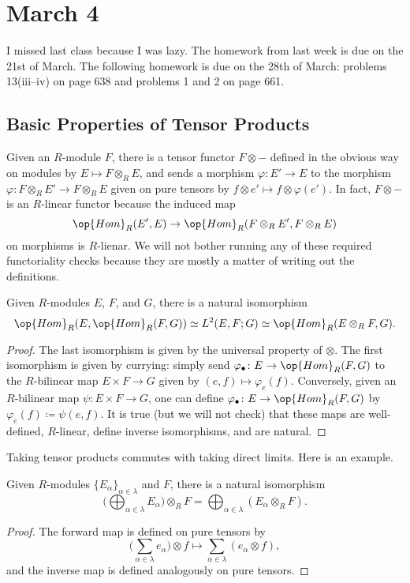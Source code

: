 \documentclass[../notes.tex]{subfiles}
\begin{document}
\section{March 4}
I missed last class because I was lazy. The homework from last week is due on the 21st of March. The following homework is due on the 28th of March: problems 13(iii--iv) on page 638 and problems 1 and 2 on page 661.

\subsection{Basic Properties of Tensor Products}
Given an $R$-module $F$, there is a tensor functor $F\otimes-$ defined in the obvious way on modules by $E\mapsto F\otimes_RE$, and sends a morphism $\varphi\colon E'\to E$ to the morphism $\varphi\colon F\otimes_RE'\to F\otimes_RE$ given on pure tensors by $f\otimes e'\mapsto f\otimes\varphi(e')$. In fact, $F\otimes-$ is an $R$-linear functor because the induced map
\[\op{Hom}_R(E',E)\to\op{Hom}_R(F\otimes_RE',F\otimes_RE)\]
on morphisms is $R$-lienar. We will not bother running any of these required functoriality checks because they are mostly a matter of writing out the definitions.
\begin{lemma} \label{lem:tensor-curry}
	Given $R$-modules $E$, $F$, and $G$, there is a natural isomorphism
	\[\op{Hom}_R(E,\op{Hom}_R(F,G))\simeq L^2(E,F;G)\simeq\op{Hom}_R(E\otimes_RF,G).\]
\end{lemma}
\begin{proof}
	The last isomorphism is given by the universal property of $\otimes$. The first isomorphism is given by currying: simply send $\varphi_\bullet\colon E\to\op{Hom}_R(F,G)$ to the $R$-bilinear map $E\times F\to G$ given by $(e,f)\mapsto\varphi_e(f)$. Conversely, given an $R$-bilinear map $\psi\colon E\times F\to G$, one can define $\varphi_\bullet\colon E\to\op{Hom}_R(F,G)$ by $\varphi_e(f)\coloneqq\psi(e,f)$. It is true (but we will not check) that these maps are well-defined, $R$-linear, define inverse isomorphisms, and are natural.
\end{proof}
Taking tensor products commutes with taking direct limits. Here is an example.
\begin{lemma} \label{lem:tensor-sum}
	Given $R$-modules $\{E_\alpha\}_{\alpha\in\lambda}$ and $F$, there is a natural isomorphism
	\[\Bigg(\bigoplus_{\alpha\in\lambda}E_\alpha\Bigg)\otimes_R F=\bigoplus_{\alpha\in\lambda}(E_\alpha\otimes_R F).\]
\end{lemma}
\begin{proof}
	The forward map is defined on pure tensors by
	\[\Bigg(\sum_{\alpha\in\lambda} e_\alpha\Bigg)\otimes f\mapsto\sum_{\alpha\in\lambda}(e_\alpha\otimes f),\]
	and the inverse map is defined analogously on pure tensors.
\end{proof}
\end{document}
